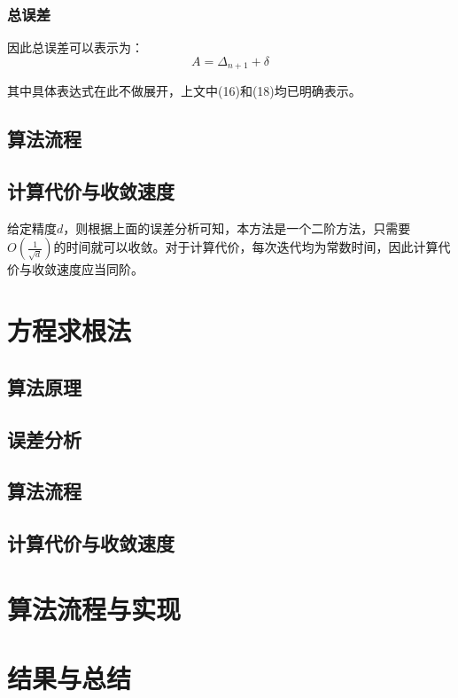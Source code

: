 \documentclass[UTF8]{ctexart}
\begin{document}
\subsubsection{总误差}

因此总误差可以表示为：
\begin{equation}
    A = \Delta_{n+1} + \delta
\end{equation}

其中具体表达式在此不做展开，上文中(16)和(18)均已明确表示。


\subsection{算法流程}

\subsection{计算代价与收敛速度}
给定精度$d$，则根据上面的误差分析可知，本方法是一个二阶方法，只需要$O(\frac{1}{\sqrt{d}})$的时间就可以收敛。对于计算代价，每次迭代均为常数时间，因此计算代价与收敛速度应当同阶。

\section{方程求根法}

\subsection{算法原理}

\subsection{误差分析}

\subsection{算法流程}

\subsection{计算代价与收敛速度}

\section{算法流程与实现}

\section{结果与总结}
\end{document}
